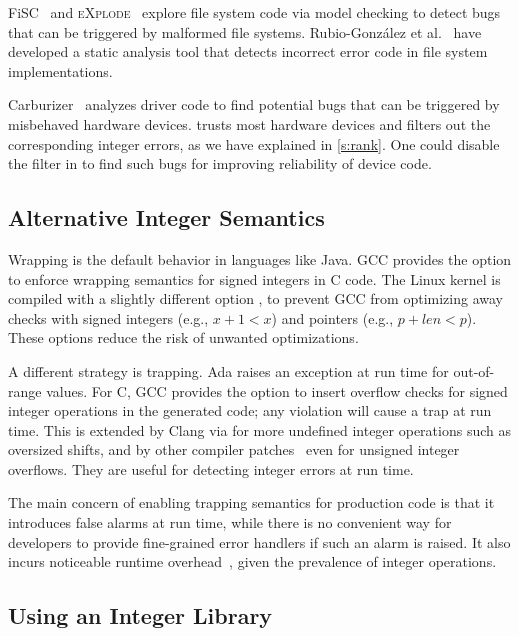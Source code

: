FiSC~\cite{fisc:yang} and \textsc{eXplode}~\cite{explode:yang}
explore file system code via model checking to detect bugs that can
be triggered by malformed file systems.
%
Rubio-Gonz\'alez et al.~\cite{eio} have developed a static analysis
tool that detects incorrect error code in file system implementations.

Carburizer~\cite{kadav:tolerating} analyzes driver code to find
potential bugs that can be triggered by misbehaved hardware devices.
\sys trusts most hardware devices and filters out the corresponding
integer errors, as we have explained in \autoref{s:rank}.  One could
disable the filter in \sys to find such bugs for improving reliability
of device code.

\subsection{Alternative Integer Semantics}

Wrapping is the default behavior in languages like Java.
GCC provides the option  to enforce wrapping semantics
for signed integers in C code.  The Linux kernel is compiled with a
slightly different option , to prevent GCC
from optimizing away checks with signed integers (e.g., $x + 1 <
x$) and pointers (e.g., $p + \mathit{len} < p$).
These options reduce the risk of unwanted optimizations.

A different strategy is trapping.  Ada raises an exception at run
time for out-of-range values.  For C, GCC provides the option
 to insert overflow checks for signed integer operations
in the generated code; any violation will cause a trap at run time.
This is extended by Clang via  for
more undefined integer operations such as oversized shifts, and by
other compiler patches~\cite{brumley:rich, ioc} even for unsigned
integer overflows.  They are useful for detecting integer errors
at run time.

The main concern of enabling trapping semantics for production code
is that it introduces false alarms at run time, while there is no
convenient way for developers to provide fine-grained error handlers
if such an alarm is raised.  It also incurs noticeable runtime
overhead~\cite{ioc}, given the prevalence of integer operations.

\subsection{Using an Integer Library}

